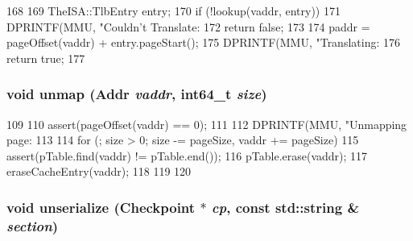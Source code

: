 \begin{DoxyCode}
168 {
169     TheISA::TlbEntry entry;
170     if (!lookup(vaddr, entry)) {
171         DPRINTF(MMU, "Couldn't Translate: %
172         return false;
173     }
174     paddr = pageOffset(vaddr) + entry.pageStart();
175     DPRINTF(MMU, "Translating: %
176     return true;
177 }
\end{DoxyCode}
\hypertarget{classPageTable_a8655228481877dd15f31d7657b7636f0}{
\subsubsection[{unmap}]{\setlength{\rightskip}{0pt plus 5cm}void unmap ({\bf Addr} {\em vaddr}, \/  int64\_\-t {\em size})}}
\label{classPageTable_a8655228481877dd15f31d7657b7636f0}



\begin{DoxyCode}
109 {
110     assert(pageOffset(vaddr) == 0);
111 
112     DPRINTF(MMU, "Unmapping page: %
113 
114     for (; size > 0; size -= pageSize, vaddr += pageSize) {
115         assert(pTable.find(vaddr) != pTable.end());
116         pTable.erase(vaddr);
117         eraseCacheEntry(vaddr);
118     }
119 
120 }
\end{DoxyCode}
\hypertarget{classPageTable_af22e5d6d660b97db37003ac61ac4ee49}{
\subsubsection[{unserialize}]{\setlength{\rightskip}{0pt plus 5cm}void unserialize ({\bf Checkpoint} $\ast$ {\em cp}, \/  const std::string \& {\em section})}}
\label{classPageTable_af22e5d6d660b97db37003ac61ac4ee49}



